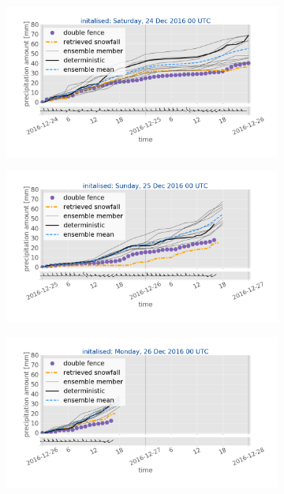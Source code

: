 \begin{figure}[t!]
\begin{subfigure}[t]{0.49\textwidth}
		\caption{}\label{fig:sfc_acc23}
	\end{subfigure}
	\begin{subfigure}[t]{0.49\textwidth}			\includegraphics[trim={3.cm 2.6cm 2.cm 1.9cm},clip,width=\textwidth]{./fig_sfc_acc/acc_wind_20161224_00}
		\caption{}\label{fig:sfc_acc24}
	\end{subfigure}
	\begin{subfigure}[t]{0.49\textwidth}
		\includegraphics[trim={3.cm 2.6cm 2.cm 1.9cm},clip,width=\textwidth]{./fig_sfc_acc/acc_wind_20161225_00}
		\caption{}\label{fig:sfc_acc25}
	\end{subfigure}
	\begin{subfigure}[t]{0.49\textwidth}	\includegraphics[trim={3.cm 2.6cm 2.cm 1.9cm},clip,width=\textwidth]{./fig_sfc_acc/acc_wind_20161226_00}

\end{subfigure}
\end{figure}
